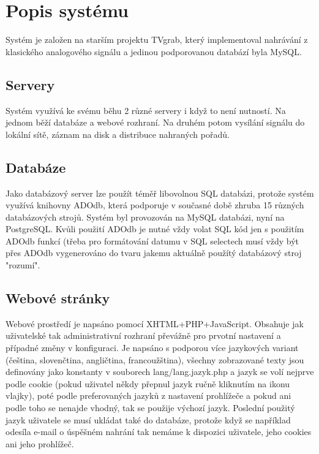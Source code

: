 \chapter{Popis systému}

Systém je založen na starším projektu TVgrab, který implementoval nahrávání z klasického analogového signálu a jedinou podporovanou databází byla MySQL.

\vspace{10pt}

\section{Servery}
Systém využívá ke svému běhu 2 různé servery i když to není nutností. Na jednom běží databáze a webové rozhraní. Na druhém potom vysílání signálu do lokální sítě, záznam na disk a distribuce nahraných pořadů.

\vspace{10pt}

\section{Databáze}
Jako databázový server lze použít téměř libovolnou SQL databázi, protože systém využívá knihovny ADOdb, která podporuje v současné době zhruba 15 různých databázových strojů. Systém byl provozován na MySQL databázi, nyní na PostgreSQL. Kvůli použití ADOdb je nutné vždy volat SQL kód jen s použitím ADOdb funkcí (třeba pro formátování datumu v SQL selectech musí vždy být přes ADOdb vygenerováno do tvaru jakemu aktuálně použítý databázový stroj "rozumí".

\vspace{10pt}

\section{Webové stránky}
Webové prostředí je napsáno pomocí XHTML+PHP+JavaScript. Obsahuje jak uživatelské tak administrativní rozhraní převážně pro prvotní nastavení a případné změny v konfiguraci. Je napsáno s podporou více jazykových variant (čeština, slovenčtina, angličtina, francoužština), všechny zobrazované texty jsou definovány jako konstanty v souborech lang/lang.jazyk.php a jazyk se volí nejprve podle cookie (pokud uživatel někdy přepnul jazyk ručně kliknutím na ikonu vlajky), poté podle preferovaných jazyků z nastavení prohlížeče a pokud ani podle toho se nenajde vhodný, tak se použije výchozí jazyk. Poslední použitý jazyk uživatele se musí ukládat také do databáze, protože když se například odesíla e-mail o úspěšném nahrání tak nemáme k dispozici uživatele, jeho cookies ani jeho prohlížeč.

